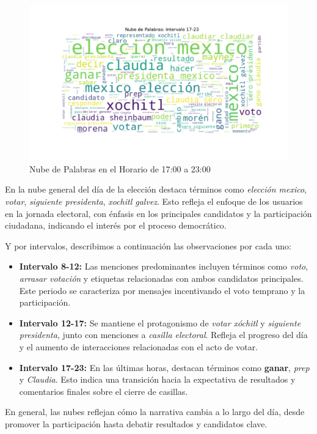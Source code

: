 \documentclass[10pt, a4paper]{article}
\begin{document}
	\vspace{-10mm}
	\begin{figure}[h!]
		\centering
		\includegraphics[width=1\textwidth]{nube_intervalo_17-23.pdf} %
		\vspace{-22mm}
		\caption{Nube de Palabras en el Horario de 17:00 a 23:00}
		\label{fig:nubeIntervalo1723} %
	\end{figure}
	
	
	En la nube general del día de la elección destaca términos como \textit{elección mexico}, \textit{votar}, \textit{siguiente presidenta}, \textit{xochitl galvez}. Esto refleja el enfoque de los usuarios en la jornada electoral, con énfasis en los principales candidatos y la participación ciudadana, indicando el interés por el proceso democrático.
	
	Y por intervalos, describimos a continuación las observaciones por cada uno:
	
	\begin{itemize}
		\item \textbf{Intervalo 8-12:} Las menciones predominantes incluyen términos como \textit{voto}, \textit{arrasar votación} y etiquetas relacionadas con ambos candidatos principales. Este periodo se caracteriza por mensajes incentivando el voto temprano y la participación.
		
		\item \textbf{Intervalo 12-17:} Se mantiene el protagonismo de \textit{votar xóchitl} y \textit{siguiente presidenta}, junto con menciones a \textit{casilla electoral}. Refleja el progreso del día y el aumento de interacciones relacionadas con el acto de votar.
		
		\item \textbf{Intervalo 17-23:} En las últimas horas, destacan términos como \textbf{ganar}, \textit{prep} y \textit{Claudia}. Esto indica una transición hacia la expectativa de resultados y comentarios finales sobre el cierre de casillas.
	\end{itemize}
	En general, las nubes reflejan cómo la narrativa cambia a lo largo del día, desde promover la participación hasta debatir resultados y candidatos clave.
	
\end{document}
